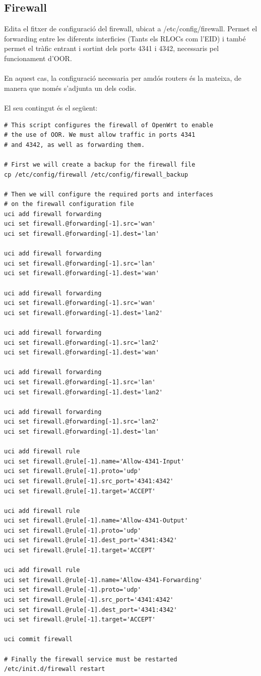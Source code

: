 \documentclass[11pt]{article}
\begin{document}
\subsection{Firewall}
Edita el fitxer de configuració del firewall, ubicat a /etc/config/firewall. Permet el forwarding entre les diferents interficies (Tants els RLOCs com l’EID) i també permet el tràfic entrant i sortint dels ports 4341 i 4342, necessaris pel funcionament d’OOR.\\
\\
En aquest cas, la configuració necessaria per amdós routers és la mateixa, de manera que només s'adjunta un dels codis.\\
\\
El seu contingut és el següent:\\
\begin{lstlisting}[frame=single]
# This script configures the firewall of OpenWrt to enable
# the use of OOR. We must allow traffic in ports 4341 
# and 4342, as well as forwarding them.

# First we will create a backup for the firewall file
cp /etc/config/firewall /etc/config/firewall_backup

# Then we will configure the required ports and interfaces 
# on the firewall configuration file
uci add firewall forwarding
uci set firewall.@forwarding[-1].src='wan'
uci set firewall.@forwarding[-1].dest='lan'

uci add firewall forwarding
uci set firewall.@forwarding[-1].src='lan'
uci set firewall.@forwarding[-1].dest='wan'

uci add firewall forwarding
uci set firewall.@forwarding[-1].src='wan'
uci set firewall.@forwarding[-1].dest='lan2'

uci add firewall forwarding
uci set firewall.@forwarding[-1].src='lan2'
uci set firewall.@forwarding[-1].dest='wan'

uci add firewall forwarding
uci set firewall.@forwarding[-1].src='lan'
uci set firewall.@forwarding[-1].dest='lan2'

uci add firewall forwarding
uci set firewall.@forwarding[-1].src='lan2'
uci set firewall.@forwarding[-1].dest='lan'

uci add firewall rule
uci set firewall.@rule[-1].name='Allow-4341-Input'
uci set firewall.@rule[-1].proto='udp'
uci set firewall.@rule[-1].src_port='4341:4342'
uci set firewall.@rule[-1].target='ACCEPT'

uci add firewall rule
uci set firewall.@rule[-1].name='Allow-4341-Output'
uci set firewall.@rule[-1].proto='udp'
uci set firewall.@rule[-1].dest_port='4341:4342'
uci set firewall.@rule[-1].target='ACCEPT'

uci add firewall rule
uci set firewall.@rule[-1].name='Allow-4341-Forwarding'
uci set firewall.@rule[-1].proto='udp'
uci set firewall.@rule[-1].src_port='4341:4342'
uci set firewall.@rule[-1].dest_port='4341:4342'
uci set firewall.@rule[-1].target='ACCEPT'

uci commit firewall

# Finally the firewall service must be restarted
/etc/init.d/firewall restart
\end{lstlisting}
\end{document}
